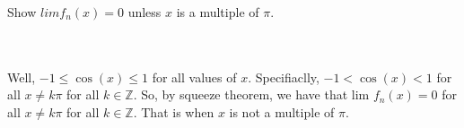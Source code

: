 Show $lim f_n(x)=0$ unless $x$ is a multiple of $\pi$.\\\\

\begin{solution}\renewcommand{\qedsymbol}{}\ \\
    Well, $-1\leq\cos(x)\leq1$ for all values of $x$. Specifiaclly, $-1<\cos(x)<1$ for all
    $x\neq k\pi$ for all $k\in\mathbb{Z}$. So, by squeeze theorem, we have that lim $f_n(x)=0$ for all
    $x\neq k\pi$ for all $k\in\mathbb{Z}$. That is when $x$ is not a multiple of $\pi$.

\end{solution}